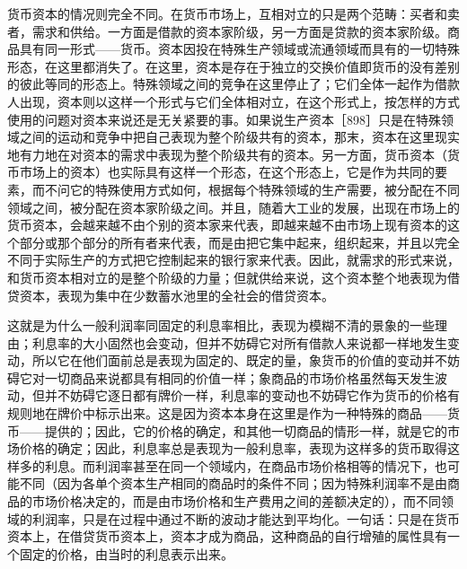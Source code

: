 货币资本的情况则完全不同。在货币市场上，互相对立的只是两个范畴：买者和卖者，需求和供给。一方面是借款的资本家阶级，另一方面是贷款的资本家阶级。商品具有同一形式——货币。资本因投在特殊生产领域或流通领域而具有的一切特殊形态，在这里都消失了。在这里，资本是存在于独立的交换价值即货币的没有差别的彼此等同的形态上。特殊领域之间的竞争在这里停止了；它们全体一起作为借款人出现，资本则以这样一个形式与它们全体相对立，在这个形式上，按怎样的方式使用的问题对资本来说还是无关紧要的事。如果说生产资本［898］只是在特殊领域之间的运动和竞争中把自己表现为整个阶级共有的资本，那末，资本在这里现实地有力地在对资本的需求中表现为整个阶级共有的资本。另一方面，货币资本（货币市场上的资本）也实际具有这样一个形态，在这个形态上，它是作为共同的要素，而不问它的特殊使用方式如何，根据每个特殊领域的生产需要，被分配在不同领域之间，被分配在资本家阶级之间。并且，随着大工业的发展，出现在市场上的货币资本，会越来越不由个别的资本家来代表，即越来越不由市场上现有资本的这个部分或那个部分的所有者来代表，而是由把它集中起来，组织起来，并且以完全不同于实际生产的方式把它控制起来的银行家来代表。因此，就需求的形式来说，和货币资本相对立的是整个阶级的力量；但就供给来说，这个资本整个地表现为借贷资本，表现为集中在少数蓄水池里的全社会的借贷资本。

这就是为什么一般利润率同固定的利息率相比，表现为模糊不清的景象的一些理由；利息率的大小固然也会变动，但并不妨碍它对所有借款人来说都一样地发生变动，所以它在他们面前总是表现为固定的、既定的量，象货币的价值的变动并不妨碍它对一切商品来说都具有相同的价值一样；象商品的市场价格虽然每天发生波动，但并不妨碍它逐日都有牌价一样，利息率的变动也不妨碍它作为货币的价格有规则地在牌价中标示出来。这是因为资本本身在这里是作为一种特殊的商品——货币——提供的；因此，它的价格的确定，和其他一切商品的情形一样，就是它的市场价格的确定；因此，利息率总是表现为一般利息率，表现为这样多的货币取得这样多的利息。而利润率甚至在同一个领域内，在商品市场价格相等的情况下，也可能不同（因为各单个资本生产相同的商品时的条件不同；因为特殊利润率不是由商品的市场价格决定的，而是由市场价格和生产费用之间的差额决定的），而不同领域的利润率，只是在过程中通过不断的波动才能达到平均化。一句话：只是在货币资本上，在借贷货币资本上，资本才成为商品，这种商品的自行增殖的属性具有一个固定的价格，由当时的利息表示出来。

